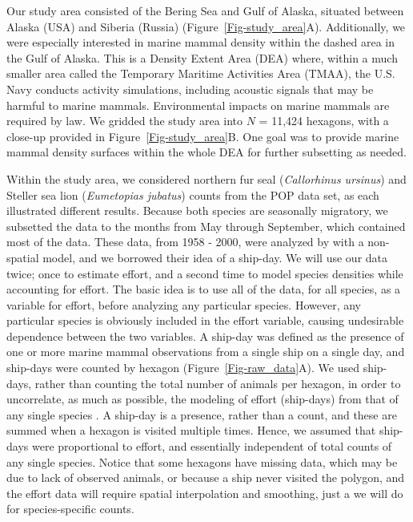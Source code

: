 \documentclass[11pt, titlepage]{article}
\begin{document}
\begin{spacing}{1.9}
\begin{flushleft}
Our study area consisted of the Bering Sea and Gulf of Alaska, situated between Alaska (USA) and Siberia (Russia) (Figure~\ref{Fig-study_area}A). Additionally, we were especially interested in marine mammal density within the dashed area in the Gulf of Alaska.  This is a Density Extent Area (DEA) where, within a much smaller area called the Temporary Maritime Activities Area (TMAA), the U.S. Navy conducts activity simulations, including acoustic signals that may be harmful to marine mammals. Environmental impacts on marine mammals are required by law. We gridded the study area into $N$ = 11,424 hexagons, with a close-up provided in Figure~\ref{Fig-study_area}B. One goal was to provide marine mammal density surfaces within the whole DEA for further subsetting as needed. 

Within the study area, we considered northern fur seal (\textit{Callorhinus ursinus}) and Steller sea lion (\textit{Eumetopias jubatus}) counts from the POP data set, as each illustrated different results.  Because both species are seasonally migratory, we subsetted the data to the months from May through September, which contained most of the data. These data, from 1958 - 2000, were analyzed by \citet{HimesBoorEtAl2012Stellersealion} with a non-spatial model, and we borrowed their idea of a ship-day.  We will use our data twice; once to estimate effort, and a second time to model species densities while accounting for effort.  The basic idea is to use all of the data, for all species, as a variable for effort, before analyzing any particular species.  However, any particular species is obviously included in the effort variable, causing undesirable dependence between the two variables. A ship-day was defined as the presence of one or more marine mammal observations from a single ship on a single day, and ship-days were counted by hexagon (Figure~\ref{Fig-raw_data}A). We used ship-days, rather than counting the total number of animals per hexagon, in order to uncorrelate, as much as possible, the modeling of effort (ship-days) from that of any single species \citep{HimesBoorEtAl2012Stellersealion}.  A ship-day is a presence, rather than a count, and these are summed when a hexagon is visited multiple times.  Hence, we assumed that ship-days were proportional to effort, and essentially independent of total counts of any single species.  Notice that some hexagons have missing data, which may be due to lack of observed animals, or because a ship never visited the polygon, and the effort data will require spatial interpolation and smoothing, just a we will do for species-specific counts. 


\end{flushleft}
\end{spacing}
\end{document}
